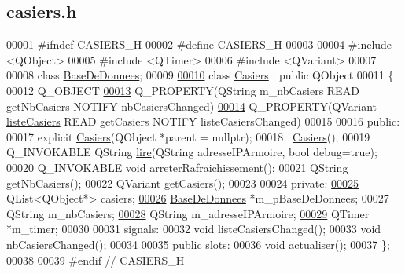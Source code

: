 \hypertarget{casiers_8h_source}{}\subsection{casiers.\+h}
\label{casiers_8h_source}

\begin{DoxyCode}
00001 \textcolor{preprocessor}{#ifndef CASIERS\_H}
00002 \textcolor{preprocessor}{#define CASIERS\_H}
00003 
00004 \textcolor{preprocessor}{#include <QObject>}
00005 \textcolor{preprocessor}{#include <QTimer>}
00006 \textcolor{preprocessor}{#include <QVariant>}
00007 
00008 \textcolor{keyword}{class }\hyperlink{class_base_de_donnees}{BaseDeDonnees};
00009 
\hyperlink{class_casiers}{00010} \textcolor{keyword}{class }\hyperlink{class_casiers}{Casiers} : \textcolor{keyword}{public} QObject
00011 \{
00012     Q\_OBJECT
\hyperlink{class_casiers_a7c4b1df1f2e320c22489234fee991f18}{00013}     Q\_PROPERTY(QString m\_nbCasiers READ getNbCasiers NOTIFY nbCasiersChanged)
\hyperlink{class_casiers_a936c4711e83f6577852a72909731fd89}{00014}     Q\_PROPERTY(QVariant \hyperlink{class_casiers_a936c4711e83f6577852a72909731fd89}{listeCasiers} READ getCasiers NOTIFY listeCasiersChanged)
00015 
00016 public:
00017     explicit \hyperlink{class_casiers}{Casiers}(QObject *parent = \textcolor{keywordtype}{nullptr});
00018     ~\hyperlink{class_casiers}{Casiers}();
00019     Q\_INVOKABLE QString \hyperlink{class_casiers_a7b1d58f40217ef13a5dd0d966df38c9a}{lire}(QString adresseIPArmoire, \textcolor{keywordtype}{bool} debug=true);
00020     Q\_INVOKABLE \textcolor{keywordtype}{void} arreterRafraichissement();
00021     QString getNbCasiers();
00022     QVariant getCasiers();
00023 
00024 private:    
\hyperlink{class_casiers_ad8fba25144a82ba49b2cd2490dcf975b}{00025}     QList<QObject*> casiers;
\hyperlink{class_casiers_ae6ac6b09a5cffe28291fc9b3289ff011}{00026}     \hyperlink{class_base_de_donnees}{BaseDeDonnees} *m\_pBaseDeDonnees;
00027     QString m\_nbCasiers;
\hyperlink{class_casiers_af745ce1cdce8dce725444e19437e0155}{00028}     QString m\_adresseIPArmoire;
\hyperlink{class_casiers_a2e2ee8b7f70d1c22acca56257d257ae6}{00029}     QTimer *m\_timer;
00030     
00031 signals:
00032     \textcolor{keywordtype}{void} listeCasiersChanged();
00033     \textcolor{keywordtype}{void} nbCasiersChanged();
00034 
00035 public slots:
00036     \textcolor{keywordtype}{void} actualiser();
00037 \};
00038 
00039 \textcolor{preprocessor}{#endif // CASIERS\_H}
\end{DoxyCode}
